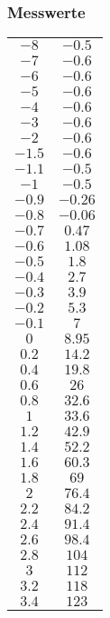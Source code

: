\subsubsection{Messwerte}
\begin{center}
\begin{tabular}{c c}
\(-8\) & \( -0.5\) \\ 
\(-7\) & \( -0.6\) \\ 
\(-6\) & \( -0.6\) \\ 
\(-5\) & \( -0.6\) \\ 
\(-4\) & \( -0.6\) \\ 
\(-3\) & \( -0.6\) \\ 
\(-2\) & \( -0.6\) \\ 
\(-1.5\) & \( -0.6\) \\ 
\(-1.1\) & \( -0.5\) \\ 
\(-1\) & \( -0.5\) \\ 
\(-0.9\) & \( -0.26\) \\ 
\(-0.8\) & \( -0.06\) \\ 
\(-0.7\) & \( 0.47\) \\ 
\(-0.6\) & \( 1.08\) \\ 
\(-0.5\) & \( 1.8\) \\ 
\(-0.4\) & \( 2.7\) \\ 
\(-0.3\) & \( 3.9\) \\ 
\(-0.2\) & \( 5.3\) \\ 
\(-0.1\) & \( 7\) \\ 
\(0\) & \( 8.95\) \\ 
\(0.2\) & \( 14.2\) \\ 
\(0.4\) & \( 19.8\) \\ 
\(0.6\) & \( 26\) \\ 
\(0.8\) & \( 32.6\) \\ 
\(1\) & \( 33.6\) \\ 
\(1.2\) & \( 42.9\) \\ 
\(1.4\) & \( 52.2\) \\ 
\(1.6\) & \( 60.3\) \\ 
\(1.8\) & \( 69\) \\ 
\(2\) & \( 76.4\) \\ 
\(2.2\) & \( 84.2\) \\ 
\(2.4\) & \( 91.4\) \\ 
\(2.6\) & \( 98.4\) \\ 
\(2.8\) & \( 104\) \\ 
\(3\) & \( 112\) \\ 
\(3.2\) & \( 118\) \\ 
\(3.4\) & \( 123\) \\ 

\end{tabular}
\end{center}
